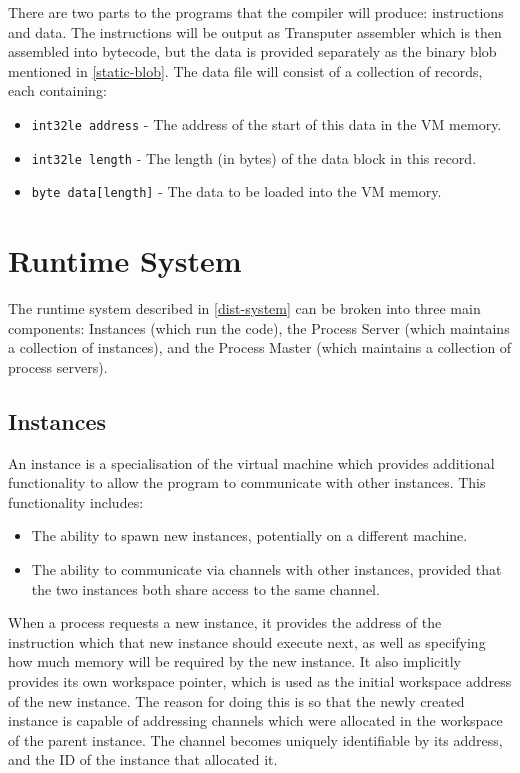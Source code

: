 There are two parts to the programs that the compiler will produce:
instructions and data. The instructions will be output as Transputer assembler
which is then assembled into bytecode, but the data is provided separately as
the binary blob mentioned in \ref{static-blob}. The data file will consist of a
collection of records, each containing:
\begin{itemize}
  \item
    \texttt{int32le address} - The address of the start of this data in the VM
    memory.
  \item
    \texttt{int32le length} - The length (in bytes) of the data block in this
    record.
  \item
    \texttt{byte data[length]} - The data to be loaded into the VM memory.
\end{itemize}

\section{Runtime System}

The runtime system described in \ref{dist-system} can be broken into three main
components: Instances (which run the code), the Process Server (which maintains
a collection of instances), and the Process Master (which maintains a collection
 of process servers).

\subsection{Instances}

An instance is a specialisation of the virtual machine which provides additional
functionality to allow the program to communicate with other instances. This
functionality includes:
\begin{itemize}
  \item The ability to spawn new instances, potentially on a different machine.
  \item The ability to communicate via channels with other instances, provided
        that the two instances both share access to the same channel.
\end{itemize}

When a process requests a new instance, it provides the address of the
instruction which that new instance should execute next, as well as specifying
how much memory will be required by the new instance. It also implicitly
provides its own workspace pointer, which is used as the initial workspace
address of the new instance. The reason for doing this is so that the newly
created instance is capable of addressing channels which were allocated in the
workspace of the parent instance. The channel becomes uniquely identifiable by
its address, and the ID of the instance that allocated it.

